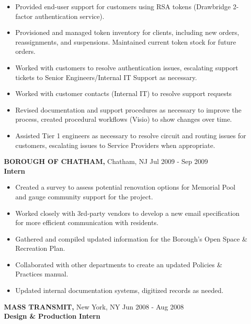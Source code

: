 \documentclass[]{article}
\providecommand{\tightlist}{%
  \setlength{\itemsep}{0pt}\setlength{\parskip}{0pt}}
\begin{document}
\begin{itemize}
\tightlist
\item
  Provided end-user support for customers using RSA tokens (Drawbridge
  2-factor authentication service).
\item
  Provisioned and managed token inventory for clients, including new
  orders, reassignments, and suspensions. Maintained current token stock
  for future orders.
\item
  Worked with customers to resolve authentication issues, escalating
  support tickets to Senior Engineers/Internal IT Support as necessary.
\item
  Worked with customer contacts (Internal IT) to resolve support
  requests
\item
  Revised documentation and support procedures as necessary to improve
  the process, created procedural workflows (Visio) to show changes over
  time.
\item
  Assisted Tier 1 engineers as necessary to resolve circuit and routing
  issues for customers, escalating issues to Service Providers when
  appropriate.
\end{itemize}

{\textbf{BOROUGH OF CHATHAM,} Chatham, NJ}{ Jul 2009 - Sep 2009}\\
\textbf{Intern}

\begin{itemize}
\tightlist
\item
  Created a survey to assess potential renovation options for Memorial
  Pool and gauge community support for the project.
\item
  Worked closely with 3rd-party vendors to develop a new email
  specification for more efficient communication with residents.
\item
  Gathered and compiled updated information for the Borough's Open Space
  \& Recreation Plan.
\item
  Collaborated with other departments to create an updated Policies \&
  Practices manual.
\item
  Updated internal documentation systems, digitized records as needed.
\end{itemize}

{\textbf{MASS TRANSMIT,} New York, NY}{ Jun 2008 - Aug 2008}\\
\textbf{Design \& Production Intern}
\end{document}
